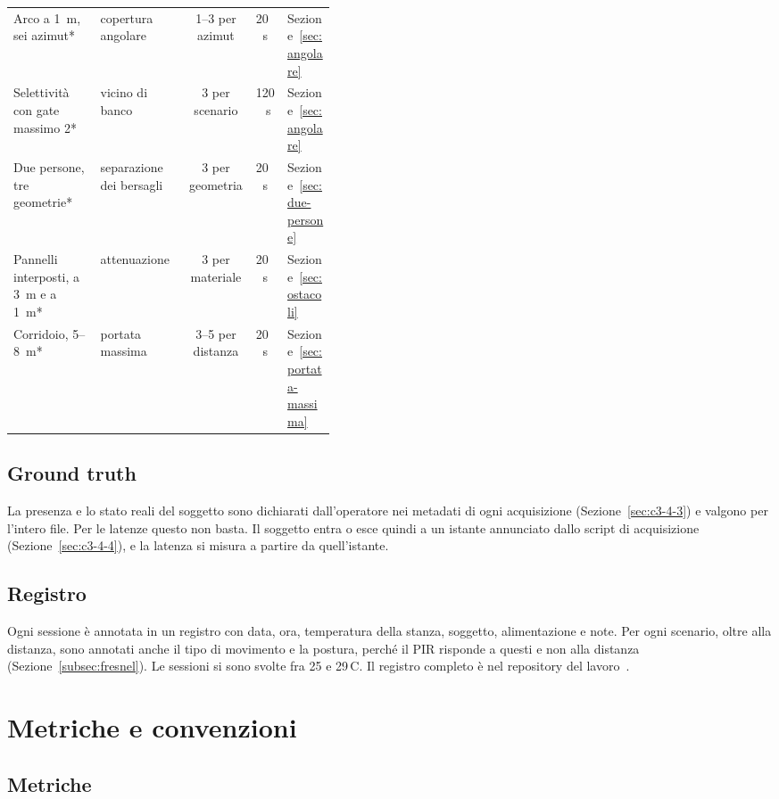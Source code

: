 \begin{table}[!htbp]
\begin{tabularx}{\linewidth}{@{}>{\raggedright\arraybackslash}p{0.27\linewidth}>{\raggedright\arraybackslash}Xcc>{\raggedright\arraybackslash}p{0.15\linewidth}@{}}
Arco a 1~m, sei azimut* & copertura angolare & 1--3 per azimut & 20~s & Sezione~\ref{sec:angolare} \\
Selettività con gate massimo 2* & vicino di banco & 3 per scenario & 120~s & Sezione~\ref{sec:angolare} \\
Due persone, tre geometrie* & separazione dei bersagli & 3 per geometria & 20~s & Sezione~\ref{sec:due-persone} \\
Pannelli interposti, a 3~m e a 1~m* & attenuazione & 3 per materiale & 20~s & Sezione~\ref{sec:ostacoli} \\
Corridoio, 5--8~m* & portata massima & 3--5 per distanza & 20~s & Sezione~\ref{sec:portata-massima} \\
\bottomrule
\end{tabularx}
\end{table}

\subsection{Ground truth}
\label{sec:protocollo-ripetizioni}
\label{sec:protocollo-groundtruth}

La presenza e lo stato reali del soggetto sono dichiarati dall'operatore nei metadati di
ogni acquisizione (Sezione~\ref{sec:c3-4-3}) e valgono per l'intero file. Per le latenze
questo non basta. Il soggetto entra o esce quindi a un istante annunciato dallo script di
acquisizione (Sezione~\ref{sec:c3-4-4}), e la latenza si misura a partire da
quell'istante.

\subsection{Registro}
\label{sec:registro}

Ogni sessione è annotata in un registro con data, ora, temperatura della stanza,
soggetto, alimentazione e note. Per ogni scenario, oltre alla distanza, sono annotati
anche il tipo di movimento e la postura, perché il PIR risponde a questi e non alla
distanza (Sezione~\ref{subsec:fresnel}). Le sessioni si sono svolte fra 25 e 29\,\textdegree C. Il registro
completo è nel repository del lavoro~\cite{repoTesi}.

\section{Metriche e convenzioni}
\label{sec:metriche}

\subsection{Metriche}
\label{sec:metriche-elenco}

